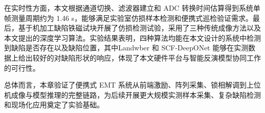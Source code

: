 在实时性方面，本文根据通道切换、滤波器建立和 ADC 转换时间估算得到系统单帧测量周期约为 1.46 s，能够满足实验室仿损样本检测和便携式巡检验证需求。最后，基于机加工缺陷铁磁试块开展了仿损检测试验，采用了三种传统成像方法以及本文提出的深度学习算法。实验结果表明，四种算法均能在本文设计的系统中检测到缺陷是否存在以及缺陷位置，其中Landwber 和 SCF-DeepONet 能够在实测数据上给出较好的对缺陷形状的响应，体现了本文硬件平台与智能反演模型协同工作的可行性。

总体而言，本章验证了便携式 EMT 系统从前端激励、阵列采集、锁相解调到上位机成像与模型推理的完整链路，为后续开展更大规模实测样本采集、复杂缺陷检测和现场化应用奠定了实验基础。